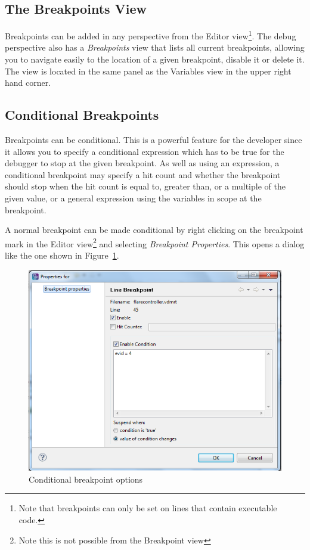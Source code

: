 \documentclass{overturerepchap}
\begin{document}
\subsection{The Breakpoints View}

Breakpoints can be added in any perspective from the Editor view\footnote{Note that
breakpoints can only be set on lines that contain executable code.}.
The debug perspective also has a \emph{Breakpoints} view that lists all current
breakpoints, allowing you to navigate easily to the location of a given breakpoint,
disable it or delete it. The view is located in
the same panel as the Variables view in the upper right hand corner.


\subsection{Conditional Breakpoints}
\label{sec:userguide:breakpoints}

Breakpoints can be conditional. This is a powerful feature for the
developer since it allows you to specify a conditional expression
which has to be true for the debugger to stop at the given breakpoint.
As well as using an expression, a conditional breakpoint may specify a
hit count and whether the breakpoint should stop when the hit count is
equal to, greater than, or a multiple of the given value, or a general
expression using the variables in scope at the breakpoint.

A normal breakpoint can be made conditional by right clicking on the breakpoint
mark in the Editor view\footnote{Note this is not possible from the Breakpoint view}
and selecting \emph{Breakpoint Properties}. This opens a dialog like the one shown in
Figure~\ref{fig:userguide:BreakpointConditional}.

\begin{figure}[htp]
\begin{center}
  \includegraphics[width=.6\textwidth]{figures/Breakpointconditional}
  \caption{Conditional breakpoint options}
  \label{fig:userguide:BreakpointConditional}
\end{center}
\end{figure}
\end{document}
